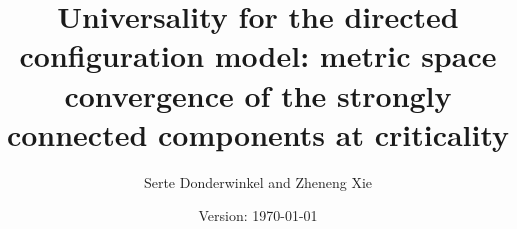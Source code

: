\documentclass[notitlepage,11pt, a4paper]{article}
\title{Universality for the directed configuration model: metric space convergence of the strongly connected components at criticality}
\author{Serte Donderwinkel and Zheneng Xie}
\date{Version: \today}
\begin{document}
\maketitle








\newpage 

\begin{appendices}

%



\end{appendices}



\end{document}

